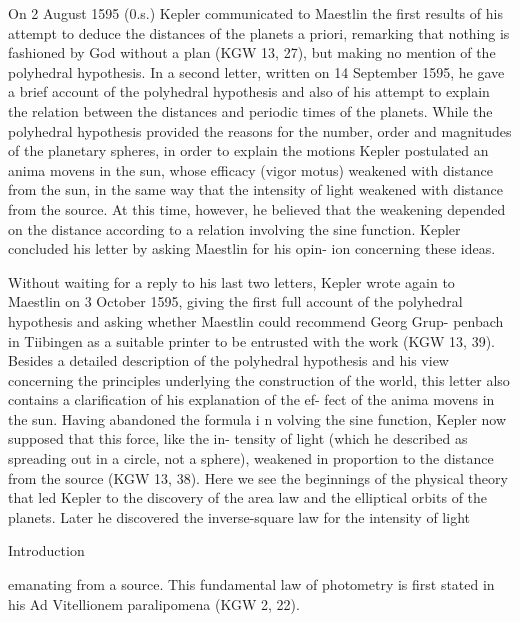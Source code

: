 \documentclass{article}
\begin{document}
On 2 August 1595 (0.s.) Kepler communicated to Maestlin the first
results of his attempt to deduce the distances of the planets a priori,
remarking that nothing is fashioned by God without a plan (KGW 13, 27),
but making no mention of the polyhedral hypothesis. In a second letter,
written on 14 September 1595, he gave a brief account of the polyhedral
hypothesis and also of his attempt to explain the relation between the
distances and periodic times of the planets. While the polyhedral
hypothesis provided the reasons for the number, order and magnitudes of
the planetary spheres, in order to explain the motions Kepler postulated
an anima movens in the sun, whose efficacy (vigor motus) weakened with
distance from the sun, in the same way that the intensity of light weakened
with distance from the source. At this time, however, he believed that the
weakening depended on the distance according to a relation involving the
sine function. Kepler concluded his letter by asking Maestlin for his opin-
ion concerning these ideas.

Without waiting for a reply to his last two letters, Kepler wrote again to
Maestlin on 3 October 1595, giving the first full account of the polyhedral
hypothesis and asking whether Maestlin could recommend Georg Grup-
penbach in Tiibingen as a suitable printer to be entrusted with the work
(KGW 13, 39). Besides a detailed description of the polyhedral hypothesis
and his view concerning the principles underlying the construction of the
world, this letter also contains a clarification of his explanation of the ef-
fect of the anima movens in the sun. Having abandoned the formula i n
volving the sine function, Kepler now supposed that this force, like the in-
tensity of light (which he described as spreading out in a circle, not a
sphere), weakened in proportion to the distance from the source (KGW
13, 38). Here we see the beginnings of the physical theory that led Kepler
to the discovery of the area law and the elliptical orbits of the planets.
Later he discovered the inverse-square law for the intensity of light

Introduction

emanating from a source. This fundamental law of photometry is first
stated in his Ad Vitellionem paralipomena (KGW 2, 22).
\end{document}
